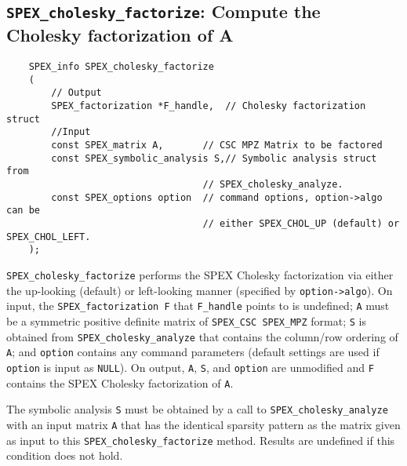 \documentclass[12pt,oneside]{book}
\theoremstyle{definition}
\begin{document}
\subsection{\texttt{SPEX\_cholesky\_factorize}: Compute the Cholesky factorization of A} \label{ss:spex_chol_factorize}
\begin{mdframed}[userdefinedwidth=\textwidth]
{\footnotesize
\begin{verbatim}
    SPEX_info SPEX_cholesky_factorize
    (
        // Output
        SPEX_factorization *F_handle,  // Cholesky factorization struct
        //Input
        const SPEX_matrix A,       // CSC MPZ Matrix to be factored   
        const SPEX_symbolic_analysis S,// Symbolic analysis struct from
                                   // SPEX_cholesky_analyze.
        const SPEX_options option  // command options, option->algo can be
                                   // either SPEX_CHOL_UP (default) or SPEX_CHOL_LEFT.
    );
\end{verbatim}
} \end{mdframed}

\verb|SPEX_cholesky_factorize| performs the SPEX Cholesky factorization via either the up-looking  (default) or left-looking manner (specified by \verb|option->algo|). On input, the \newline
\verb|SPEX_factorization F| that \verb|F_handle| points to is undefined; \verb|A| must be a symmetric positive definite matrix of \verb|SPEX_CSC SPEX_MPZ| format; \verb|S| is obtained from \verb|SPEX_cholesky_analyze| that contains the column/row ordering of \verb|A|; and \verb|option| contains any command parameters   (default settings are used if
\verb|option| is input as \verb|NULL|). On output, \verb|A|, \verb|S|, and \verb|option| are unmodified and \verb|F| contains the SPEX Cholesky factorization of \verb|A|.

The symbolic analysis \verb'S' must be obtained by a call
to \verb'SPEX_cholesky_analyze' with an input matrix \verb'A'
that has the identical sparsity pattern as the matrix given
as input to this \verb'SPEX_cholesky_factorize' method.  Results are undefined if this condition does not hold.
\end{document}
